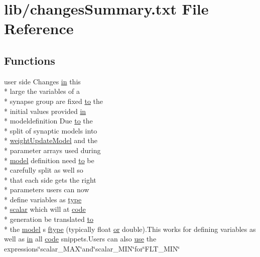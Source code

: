 \hypertarget{changesSummary_8txt}{\section{lib/changes\+Summary.txt File Reference}
\label{changesSummary_8txt}
}
\subsection*{Functions}
\begin{DoxyCompactItemize}
\item 
user side Changes \hyperlink{README_8txt_a148897a6b2cc9cff25af80abb13426b0}{in} this \\*
large the variables of a \\*
synapse group are fixed \hyperlink{README_8txt_add1f2ee32acc15ef77f839d4382c9768}{to} the \\*
initial values provided \hyperlink{README_8txt_a148897a6b2cc9cff25af80abb13426b0}{in} \\*
modeldefinition Due \hyperlink{README_8txt_add1f2ee32acc15ef77f839d4382c9768}{to} the \\*
split of synaptic models into \\*
\hyperlink{classweightUpdateModel}{weight\+Update\+Model} and the \\*
parameter arrays used during \\*
\hyperlink{README_8txt_a69fd801b7213948c12d9dd7eebb3ed14}{model} definition need \hyperlink{README_8txt_add1f2ee32acc15ef77f839d4382c9768}{to} be \\*
carefully split as well so \\*
that each side gets the right \\*
parameters users can now \\*
define variables as \hyperlink{userproject_2PoissonIzh__project_2README_8txt_a18700dbf29429942d4c3eda1e02fdef7}{type} \\*
\hyperlink{gen__input__structured_8cc_a6d99cd2efc6cbd8f720384a7444ed035}{scalar} which will at \hyperlink{userproject_2MBody__userdef__project_2README_8txt_aeec4e596748e7c29dd5548dae4c70685}{code} \\*
generation be translated \hyperlink{README_8txt_add1f2ee32acc15ef77f839d4382c9768}{to} \\*
the \hyperlink{README_8txt_a69fd801b7213948c12d9dd7eebb3ed14}{model} s \hyperlink{changesSummary_8txt_a90c3be2c24228d810dcb32c88ec522db}{ftype} (typically float \hyperlink{userproject_2PoissonIzh__project_2README_8txt_ad4021097ab0ba066271614bf3f4c2e27}{or} double).This works for defining variables as well as \hyperlink{README_8txt_a148897a6b2cc9cff25af80abb13426b0}{in} all \hyperlink{userproject_2MBody__userdef__project_2README_8txt_aeec4e596748e7c29dd5548dae4c70685}{code} snippets.\+Users can also \hyperlink{README_8txt_acf386c48a14a2099c9220d6bcde40fc8}{use} the expressions\char`\"{}scalar\+\_\+\+M\+A\+X\char`\"{}and\char`\"{}scalar\+\_\+\+M\+I\+N\char`\"{}for\char`\"{}F\+L\+T\+\_\+\+M\+I\+N\char`\"{}

\end{DoxyCompactItemize}
